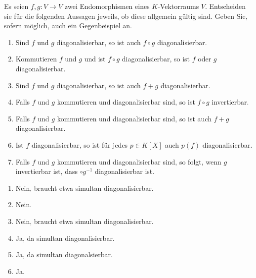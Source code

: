 \begin{question}
  Es seien $f, g \colon V \to V$ zwei Endomorphismen eines $K$-Vektorraums $V$.
  Entscheiden sie für die folgenden Aussagen jeweils, ob diese allgemein gültig sind.
  Geben Sie, sofern möglich, auch ein Gegenbeispiel an.
  \begin{enumerate}[leftmargin=*]
    \item
      Sind $f$ und $g$ diagonalisierbar, so ist auch $f \circ g$ diagonalisierbar.
    \item
      Kommutieren $f$ und $g$ und ist $f \circ g$ diagonalisierbar, so ist $f$ oder $g$ diagonalisierbar.
    \item
      Sind $f$ und $g$ diagonalisierbar, so ist auch $f + g$ diagonalisierbar.
    \item
      Falls $f$ und $g$ kommutieren und diagonalisierbar sind, so ist $f \circ g$ invertierbar.
    \item
      Falls $f$ und $g$ kommutieren und diagonalisierbar sind, so ist auch $f + g$ diagonalisierbar.
    \item
      Ist $f$ diagonalisierbar, so ist für jedes $p \in K[X]$ auch $p(f)$ diagonalisierbar.
    \item
      Falls $f$ und $g$ kommutieren und diagonalisierbar sind, so folgt, wenn $g$ invertierbar ist, dass $ \circ g^{-1}$ diagonalisierbar ist.
  \end{enumerate}
\end{question}

\begin{solution}
  \begin{enumerate}
    \item
      Nein, braucht etwa simultan diagonalisierbar.
    \item
      Nein.
    \item
      Nein, braucht etwa simultan diagonalisierbar.
    \item
      Ja, da simultan diagonalisierbar.
    \item
      Ja, da simultan diagonalsierbar.
    \item
      Ja.
  \end{enumerate}
\end{solution}


